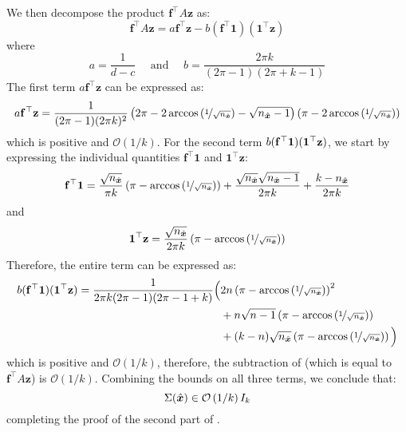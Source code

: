 We then decompose the product $\mathbf{f}^\top A\mathbf{z}$ as:
\begin{equation}
    \label{eq:fTAz}
    \mathbf{f}^\top A\mathbf{z} = a\mathbf{f}^\top\mathbf{z} - b(\mathbf{f}^\top\mathbf{1})(\mathbf{1}^\top\mathbf{z})
\end{equation}
where
\begin{equation*}
    a = \frac{1}{d-c} \quad \textrm{ and } \quad b = \frac{2\pi k}{(2\pi-1)(2\pi+k-1)}
\end{equation*}
The first term $a\mathbf{f}^\top\mathbf{z}$ can be expressed as:
\begin{equation*}
    a\mathbf{f}^\top\mathbf{z} = \frac{1}{(2\pi -1)(2\pi k)^2}\left(2\pi - 2\arccos\left(\nicefrac{1}{\sqrt{n_{\hat{\boldsymbol{x}}}}}\right)- \sqrt{n_{\hat{\boldsymbol{x}}}-1}\right)\left(\pi - 2\arccos\left(\nicefrac{1}{\sqrt{n_{\hat{\boldsymbol{x}}}}}\right)\right)
\end{equation*}
which is positive and $\mathcal{O}\left(1/k\right)$. For the second term $b(\mathbf{f}^\top\boldsymbol{1})(\boldsymbol{1}^\top\mathbf{z})$, we start by expressing the  individual quantities $\mathbf{f}^\top\mathbf{1}$ and $\mathbf{1}^\top\mathbf{z}$:
\begin{equation*}
    \mathbf{f}^\top\mathbf{1} = \frac{\sqrt{n_{\hat{\boldsymbol{x}}}}}{\pi k}\left(\pi - \arccos\left(\nicefrac{1}{\sqrt{n_{\hat{\boldsymbol{x}}}}}\right)\right) + \frac{\sqrt{n_{\hat{\boldsymbol{x}}}}\sqrt{n_{\hat{\boldsymbol{x}}}-1}}{2\pi k} + \frac{k-n_{\hat{\boldsymbol{x}}}}{2\pi k}
\end{equation*}
and 
\begin{equation*}
    \mathbf{1}^\top\mathbf{z} = \frac{\sqrt{n_{\hat{\boldsymbol{x}}}}}{2\pi k}\left(\pi - \arccos\left(\nicefrac{1}{\sqrt{n_{\hat{\boldsymbol{x}}}}}\right)\right)
\end{equation*}
Therefore, the entire term can be expressed as:
\begin{align*}
    b(\mathbf{f}^\top\boldsymbol{1})(\boldsymbol{1}^\top\mathbf{z}) = \frac{1}{2\pi k(2\pi-1)(2\pi-1+k)}\Big(& 2n\left(\pi - \arccos\left(\nicefrac{1}{\sqrt{n_{\hat{\boldsymbol{x}}}}}\right)\right)^2\\&+n\sqrt{n-1}\left(\pi - \arccos\left(\nicefrac{1}{\sqrt{n_{\hat{\boldsymbol{x}}}}}\right)\right)\\
    &+ (k-n)\sqrt{n_{\hat{\boldsymbol{x}}}}\left(\pi - \arccos\left(\nicefrac{1}{\sqrt{n_{\hat{\boldsymbol{x}}}}}\right)\right)\Big)
\end{align*}
which is positive and $\mathcal{O}\left(1/k\right)$, therefore, the subtraction of  (which is equal to $\mathbf{f}^\top A\mathbf{z}$) is $\mathcal{O}\left(1/k\right)$. Combining the bounds on all three terms, we conclude that:
$$
\Sigma(\hat{\boldsymbol{x}}) \in \mathcal{O}\left( 1/k \right)I_k
$$
completing the proof of the second part of .



